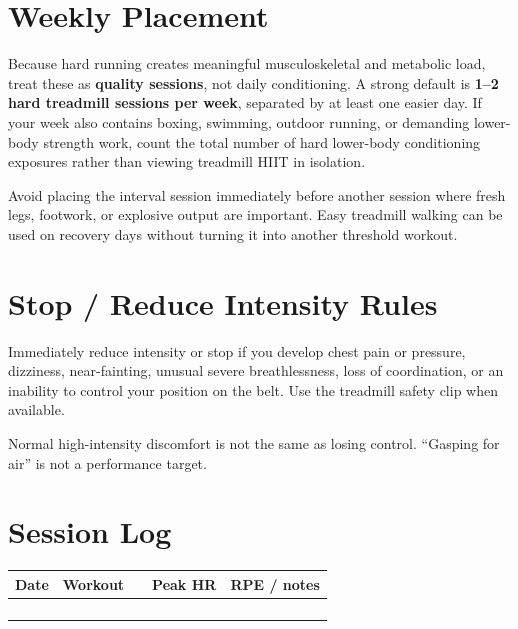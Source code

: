 \documentclass[11pt]{article}
\begin{document}
\section{Weekly Placement}

Because hard running creates meaningful musculoskeletal and metabolic load, treat these as \textbf{quality sessions}, not daily conditioning. A strong default is \textbf{1--2 hard treadmill sessions per week}, separated by at least one easier day. If your week also contains boxing, swimming, outdoor running, or demanding lower-body strength work, count the total number of hard lower-body conditioning exposures rather than viewing treadmill HIIT in isolation.

Avoid placing the interval session immediately before another session where fresh legs, footwork, or explosive output are important. Easy treadmill walking can be used on recovery days without turning it into another threshold workout.

\section{Stop / Reduce Intensity Rules}

\begin{tcolorbox}[colback=light,colframe=accent,boxrule=0.8pt,arc=2mm]
Immediately reduce intensity or stop if you develop chest pain or pressure, dizziness, near-fainting, unusual severe breathlessness, loss of coordination, or an inability to control your position on the belt. Use the treadmill safety clip when available.
\end{tcolorbox}

Normal high-intensity discomfort is not the same as losing control. ``Gasping for air'' is not a performance target.

\section{Session Log}

\begin{center}
\begin{tabularx}{\textwidth}{@{}p{} p{} p{} p{} Y@{}}
\toprule
\textbf{Date} & \textbf{Workout} & \textbf{} & \textbf{Peak HR} & \textbf{RPE / notes}\\
\midrule
\rule{0pt}{1.7em} & & & &\\
\rule{0pt}{1.7em} & & & &\\
\rule{0pt}{1.7em} & & & &\\
\rule{0pt}{1.7em} & & & &\\
\bottomrule
\end{tabularx}
\end{center}
\end{document}
